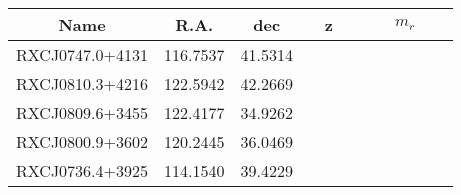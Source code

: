 \documentclass[12pt]{article}
\begin{document}



\begin{center}
\begin{tabular}{|c|c|c|c|c|}
\hline
Name & R.A. & dec & z & $m_r$ \\ \hline 
RXCJ0747.0+4131 & 116.7537 & 41.5314 &{\hspace{1cm}} &{\ \ \ \ \ \ \ \ \ \ }\\ \hline  %
RXCJ0810.3+4216 & 122.5942 & 42.2669 &{\ \ \ \ \ }&\\ \hline %
RXCJ0809.6+3455 & 122.4177 & 34.9262 &{\ \ \ \ \  }&\\ \hline %
RXCJ0800.9+3602 & 120.2445 & 36.0469  &{\ \ \ \ \  }&\\ \hline %
RXCJ0736.4+3925 & 114.1540 & 39.4229  & &\\ \hline  %

\end{tabular}
\end{center}
\end{document}
